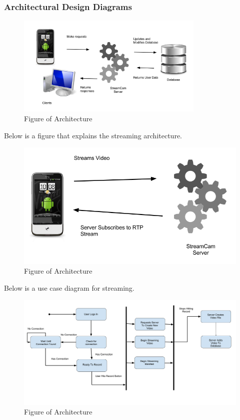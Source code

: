 \documentclass[11pt,a4paper,titlepage]{article}
\begin{document}
\subsubsection{Architectural Design Diagrams}

\begin{figure}[H]
  \centering
  \includegraphics[width=0.8\textwidth]{img/architecture.png}
  \caption{Figure of Architecture}
\end{figure}

Below is a figure that explains the streaming architecture.

\begin{figure}[H]
  \centering
  \includegraphics[width=5in]{img/streaming-architecture.png}
  \caption{Figure of Architecture}
\end{figure}

Below is a use case diagram for streaming.

\begin{figure}[H]
  \centering
  \includegraphics[width=5in]{img/uml_streaming.png}
  \caption{Figure of Architecture}
\end{figure}
\end{document}

